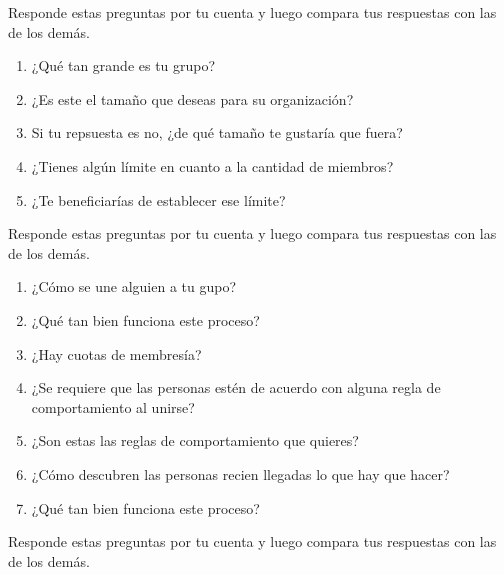 
Responde estas preguntas por tu cuenta y
luego compara tus respuestas con las de los demás.


\begin{enumerate}

\item
¿Qué tan grande es tu grupo?

\item
  ¿Es este el tamaño que deseas para su organización?

\item
  Si tu repsuesta es no, ¿de qué tamaño te gustaría que fuera?

\item
  ¿Tienes algún límite en cuanto a la cantidad de miembros?

\item
  ¿Te beneficiarías de establecer ese límite?

\end{enumerate}


Responde estas preguntas por tu cuenta y
luego compara tus respuestas con las de los demás.


\begin{enumerate}

\item
  ¿Cómo se une alguien a tu gupo?

\item
  ¿Qué tan bien funciona este proceso?

\item
	¿Hay cuotas de membresía?

\item
  ¿Se requiere que las personas estén de acuerdo con alguna regla de comportamiento al unirse?

\item
  ¿Son estas las reglas de comportamiento que quieres?

\item
  ¿Cómo descubren las personas recien llegadas lo que hay que hacer?

\item
  ¿Qué tan bien funciona este proceso?
  
\end{enumerate}


Responde estas preguntas por tu cuenta y
luego compara tus respuestas con las de los demás.


